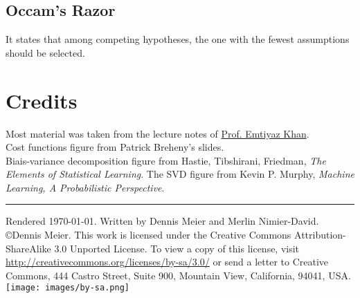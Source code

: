 \documentclass[10pt,a4paper,landscape]{article}
\begin{document}
\begin{multicols*}{4}
\subsection{Occam's Razor}
It states that among competing hypotheses, the one with the fewest assumptions should be selected. %




\section{Credits}
Most material was taken from the lecture notes of \href{http://people.epfl.ch/228491}{Prof. Emtiyaz Khan}.\\
Cost functions figure from Patrick Breheny's slides.\\
Biais-variance decomposition figure from Hastie, Tibshirani, Friedman, \textit{The Elements of Statistical Learning}.
The SVD figure from Kevin P. Murphy, \textit{Machine Learning, A Probabilistic Perspective}.

\hrule
\tiny
Rendered \today. Written by Dennis Meier and Merlin Nimier-David.
\copyright Dennis Meier. This work is licensed under the Creative Commons Attribution-ShareAlike 3.0 Unported License.
To view a copy of this license, visit \href{http://creativecommons.org/licenses/by-sa/3.0/}{http://creativecommons.org/licenses/by-sa/3.0/} or
send a letter to Creative Commons, 444 Castro Street, Suite 900, Mountain View, California, 94041, USA.
\texttt{[image: images/by-sa.png]}

\end{multicols*}
\end{document}
